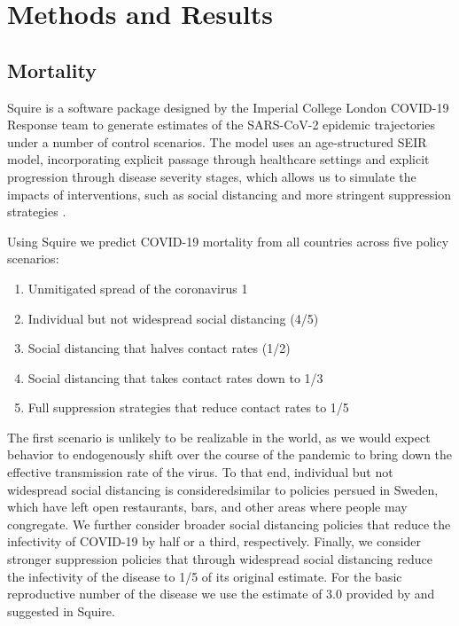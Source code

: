 \documentclass[11pt]{article}
\begin{document}
\section{Methods and Results}

\subsection{Mortality}

Squire is a software package designed by the Imperial College London COVID-19 Response team to generate estimates of the SARS-CoV-2 epidemic trajectories under a number of control scenarios. The model uses an age-structured SEIR model, incorporating explicit passage through healthcare settings and explicit progression through disease severity stages, which allows us to simulate the impacts of interventions, such as social distancing and more stringent suppression strategies \parencite{squire}.

Using Squire we predict COVID-19 mortality from all countries across five policy scenarios:
\begin{enumerate}
	\item Unmitigated spread of the coronavirus 1
	\item Individual but not widespread social distancing (4/5)
	\item Social distancing that halves contact rates (1/2)
	\item Social distancing that takes contact rates down to 1/3
	\item Full suppression strategies that reduce contact rates to 1/5
\end{enumerate}

The first scenario is unlikely to be realizable in the world, as we would expect behavior to endogenously shift over the course of the pandemic to bring down the effective transmission rate of the virus. To that end, individual but not widespread social distancing is considered\textemdash similar to policies persued in Sweden, which have left open restaurants, bars, and other areas where people may congregate. %
We further consider broader social distancing policies that reduce the infectivity of COVID-19 by half or a third, respectively. Finally, we consider stronger suppression policies that through widespread social distancing reduce the infectivity of the disease to 1/5 of its original estimate. For the basic reproductive number of the disease we use the estimate of 3.0 provided by \textcite{flaxman2020} and suggested in Squire.  %
\end{document}
